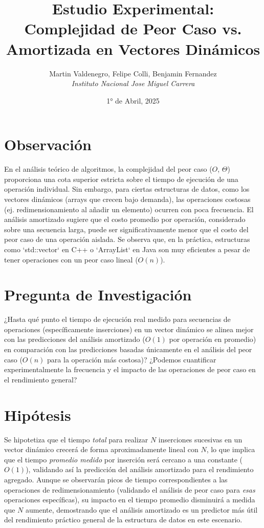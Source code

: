 \documentclass[11pt, a4paper]{article}
\title{Estudio Experimental: Complejidad de Peor Caso vs. Amortizada en Vectores Dinámicos}
\author{Martin Valdenegro, Felipe Colli, Benjamin Fernandez \\ \textit{Instituto Nacional Jose Miguel Carrera}} %
\date{1° de Abril, 2025}
\begin{document}
\maketitle

\section{Observación}
En el análisis teórico de algoritmos, la complejidad del peor caso ($O$, $\Theta$) proporciona una cota superior estricta sobre el tiempo de ejecución de una operación individual. Sin embargo, para ciertas estructuras de datos, como los vectores dinámicos (arrays que crecen bajo demanda), las operaciones costosas (ej. redimensionamiento al añadir un elemento) ocurren con poca frecuencia. El análisis amortizado sugiere que el costo promedio por operación, considerado sobre una secuencia larga, puede ser significativamente menor que el costo del peor caso de una operación aislada. Se observa que, en la práctica, estructuras como `std::vector` en C++ o `ArrayList` en Java son muy eficientes a pesar de tener operaciones con un peor caso lineal ($O(n)$).

\section{Pregunta de Investigación}
¿Hasta qué punto el tiempo de ejecución real medido para secuencias de operaciones (específicamente inserciones) en un vector dinámico se alinea mejor con las predicciones del análisis amortizado ($O(1)$ por operación en promedio) en comparación con las predicciones basadas únicamente en el análisis del peor caso ($O(n)$ para la operación más costosa)? ¿Podemos cuantificar experimentalmente la frecuencia y el impacto de las operaciones de peor caso en el rendimiento general?

\section{Hipótesis}
Se hipotetiza que el tiempo \emph{total} para realizar $N$ inserciones sucesivas en un vector dinámico crecerá de forma aproximadamente lineal con $N$, lo que implica que el tiempo \emph{promedio medido} por inserción será cercano a una constante ($O(1)$), validando así la predicción del análisis amortizado para el rendimiento agregado. Aunque se observarán picos de tiempo correspondientes a las operaciones de redimensionamiento (validando el análisis de peor caso para \emph{esas} operaciones específicas), su impacto en el tiempo promedio disminuirá a medida que $N$ aumente, demostrando que el análisis amortizado es un predictor más útil del rendimiento práctico general de la estructura de datos en este escenario.
\end{document}

